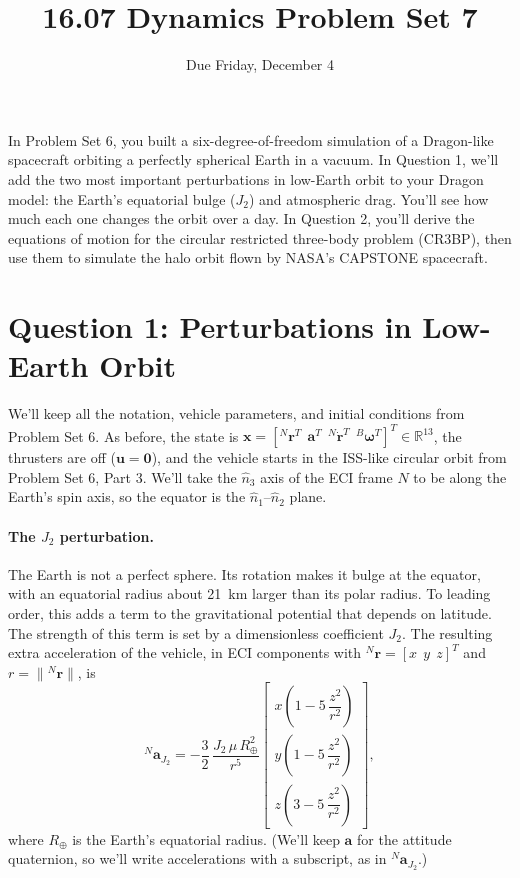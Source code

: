 \documentclass[11pt,letterpaper]{article}
\title{16.07 Dynamics Problem Set 7}
\author{Due Friday, December 4}
\date{}
\newcommand{\Bw}{{}^{B}\boldsymbol{\omega}}
\newcommand{\ba}{\mathbf{a}}
\newcommand{\bx}{\mathbf{x}}
\newcommand{\bu}{\mathbf{u}}
\newcommand{\Nr}{{}^{N}\mathbf{r}}
\newcommand{\Nrd}{{}^{N}\dot{\mathbf{r}}}
\begin{document}
\maketitle

\noindent In Problem Set 6, you built a six-degree-of-freedom simulation of a Dragon-like spacecraft orbiting a perfectly spherical Earth in a vacuum. In Question 1, we'll add the two most important perturbations in low-Earth orbit to your Dragon model: the Earth's equatorial bulge ($J_2$) and atmospheric drag. You'll see how much each one changes the orbit over a day. In Question 2, you'll derive the equations of motion for the circular restricted three-body problem (CR3BP), then use them to simulate the halo orbit flown by NASA's CAPSTONE spacecraft.

\section*{Question 1: Perturbations in Low-Earth Orbit}

We'll keep all the notation, vehicle parameters, and initial conditions from Problem Set 6. As before, the state is $\bx = [\Nr^T\;\,\ba^T\;\,\Nrd^T\;\,\Bw^T]^T \in \mathbb{R}^{13}$, the thrusters are off ($\bu = \mathbf{0}$), and the vehicle starts in the ISS-like circular orbit from Problem Set 6, Part 3. We'll take the $\hat n_3$ axis of the ECI frame $N$ to be along the Earth's spin axis, so the equator is the $\hat n_1$--$\hat n_2$ plane.

\paragraph{The $J_2$ perturbation.} The Earth is not a perfect sphere. Its rotation makes it bulge at the equator, with an equatorial radius about 21~km larger than its polar radius. To leading order, this adds a term to the gravitational potential that depends on latitude. The strength of this term is set by a dimensionless coefficient $J_2$. The resulting extra acceleration of the vehicle, in ECI components with $\Nr = [x\;\,y\;\,z]^T$ and $r = \lVert\Nr\rVert$, is
\begin{equation}
{}^{N}\ba_{J_2} = -\frac{3}{2}\,\frac{J_2\,\mu\,R_\oplus^2}{r^5}
\begin{bmatrix}
x\left(1 - 5\,\dfrac{z^2}{r^2}\right) \\[8pt]
y\left(1 - 5\,\dfrac{z^2}{r^2}\right) \\[8pt]
z\left(3 - 5\,\dfrac{z^2}{r^2}\right)
\end{bmatrix},
\label{eq:j2}
\end{equation}
where $R_\oplus$ is the Earth's equatorial radius. (We'll keep $\mathbf{a}$ for the attitude quaternion, so we'll write accelerations with a subscript, as in ${}^{N}\ba_{J_2}$.)
\end{document}
